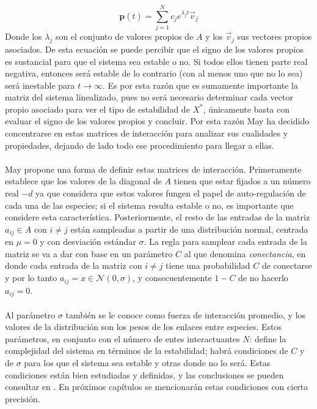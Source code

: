 $$\textbf{p}(t)=\sum_{j=1}^N c_{j}e^{\lambda_{j}t}\vec{v}_j$$
Donde los $\lambda_{j}$ son el conjunto de valores propios de $A$ y los $\vec{v}_j$ sus vectores propios asociados. De esta ecuación se puede percibir que el signo de los valores propios es sustancial para que el sistema sea estable o no. Si todos ellos tienen parte real negativa, entonces será estable de lo contrario (con al menos uno que no lo sea) será inestable para $t\to\infty$. Es por esta razón que es sumamente importante la matriz del sistema linealizado, pues no será necesario determinar cada vector propio asociado para ver el tipo de estabilidad de $X^*$, únicamente basta con evaluar el signo de los valores propios y concluir. Por esta razón May ha decidido concentrarse en estas matrices de interacción para analizar sus cualidades y propiedades, dejando de lado todo ese procedimiento para llegar a ellas.
\\
\\
May propone una forma de definir estas matrices de interacción. Primeramente establece que los valores de la diagonal de $A$ tienen que estar fijados a un número real $-d$ ya que considera que estos valores fungen el papel de auto-regulación de cada una de las especies; si el sistema resulta estable o no, es importante que considere esta característica. Posteriormente, el resto de las entradas de la matriz $a_{ij}\in A$ con $i\neq j$ están sampleadas a partir de una distribución normal, centrada en $\mu=0$ y con desviación estándar $\sigma$. La regla para samplear cada entrada de la matriz se va a dar con base en un parámetro $C $ al que denomina \textit{conectancia}, en donde cada entrada de la matriz con $i\neq j$ tiene una probabilidad $C$ de conectarse y por lo tanto $a_{ij}=x\in\mathcal{N}(0,\sigma)$, y consecuentemente $1-C$ de no hacerlo $ a_{ij}=0$.\\
\\
Al parámetro $\sigma$ también se le conoce como fuerza de interacción promedio, y los valores de la distribución son los pesos de los enlaces entre especies. Estos parámetros, en conjunto con el número de entes interactuantes $N$: define la complejidad del sistema en términos de la estabilidad; habrá condiciones de $C$ y de $\sigma$ para los que el sistema sea estable y otras donde no lo será. Estas condiciones están bien estudiadas y definidas, y las conclusiones se pueden consultar en \cite{may1972will}. En próximos capítulos se mencionarán estas condiciones con cierta precisión. 
\\
\\
